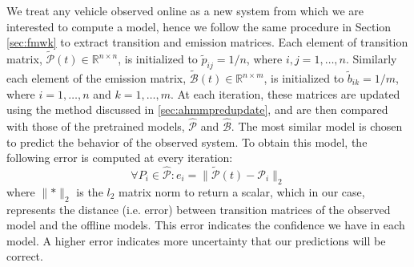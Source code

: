 \documentclass[letterpaper, 10 pt, conference]{ieeeconf}  %
\newcommand\NB[1]{$\spadesuit$\footnote{NB: #1}}
\begin{document}

We treat any vehicle observed online as a new system from which we are interested to compute a model, hence we follow the same procedure in Section \ref{sec:fmwk} to extract transition and emission matrices. Each element of transition matrix, $\tilde{\mathcal{P}}(t)\in\mathbb{R}^{n\times n}$, is initialized to $\tilde{p}_{ij} = 1/n$, where $i,j = 1,\ldots,n$. Similarly each element of the emission matrix,  $\tilde{\mathcal{B}}(t)\in\mathbb{R}^{n\times m}$, is initialized to $\tilde{b}_{ik}= 1/m$, where $i = 1,\ldots,n$ and $k=1,\ldots,m$. At each iteration, these matrices are updated using the method discussed in \ref{sec:ahmmpredupdate}, and are then compared with those of the pretrained models, $\hat{\mathcal{P}}$ and $\hat{\mathcal{B}}$. The most similar model is chosen to predict the behavior of the observed system. To obtain this model, the following error is computed at every iteration:
\begin{equation} \label{eq:pnorm}
    \forall{P_i} \in \hat{\mathcal{P}}: e_i = \lVert\tilde{\mathcal{P}}(t)-\mathcal{P}_{i}\rVert_{2}
\end{equation}
where $\lVert * \rVert_2$ is the $l_2$ matrix norm to return a scalar, which in our case, represents the distance (i.e. error) between transition matrices of the observed model and the offline models. This error indicates the confidence we have in each model. A higher error indicates more uncertainty that our predictions will be correct.
\end{document}
